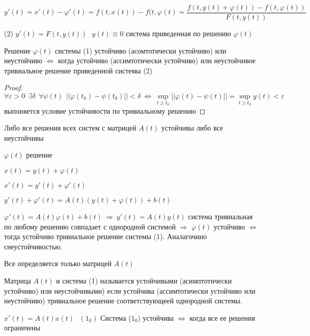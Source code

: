 $$
y'(t) = x'(t) - \varphi'(t) = f(t, x(t)) - f(t, \varphi(t) = \frac{f(t, y(t) +
\varphi(t)) - f(t, \varphi(t))}{F(t, y(t))}
$$

(2) $y'(t) = F(t, y(t)) ~~~ y(t) \equiv 0$ система приведенная по решению
$\varphi(t)$

\begin{block}[Утверждение]
  Решение $\varphi(t)$ системы (1) устойчиво (асомтотически устойчиво) или
  неустойчиво $\Leftrightarrow$ когда устойчиво (ассимтотически устойчиво) или
  неустойчивое тривиальное решение приведенной системы (2)
\end{block}

\begin{proof}
  $$
  \forall \varepsilon > 0 ~~ \exists \delta ~~ \forall \psi(t) ~~
  ||\varphi(t_0) - \psi(t_0)|| < \delta ~ \Leftrightarrow ~ \sup_{t \ge t_0}
  ||\varphi(t) - \psi(t)|| = \sup_{t \ge t_0} y(t) < \varepsilon
  $$
  выпоняется условие устойчивости по тривиальному решению
\end{proof}

\begin{block}[Утверждение]
  Либо все решения всех систем с матрицей $A(t)$ устойчивы либо все неустойчивы

  $\varphi(t)$ решение

  $x(t) = y(t) + \varphi(t)$

  $x'(t) = y'(t) + \varphi'(t)$

  $y'(t) + \varphi'(t) = A(t)(y(t) + \varphi(t)) + b(t)$

  $\varphi'(t) = A(t)\varphi(t) + b(t) ~ \Rightarrow ~ y'(t) = A(t)y(t)$
  система тривиальная по любому решению совпадает с однородной системой
  $\Rightarrow$ $\varphi(t)$ устойчиво $\Leftrightarrow$ тогда устойчиво
  тривиальное решение системы (1). Аналагочино снеустойчивостью.

  Все определяется только матрицей $A(t)$
\end{block}

\begin{define}
  Матрица $A(t)$ и система (1) называется устойчивыми (асимптотически устойчиво)
  или неустойчивыми) если устойчива (ассимтотически устойчиво или неустойчиво)
  тривиальное решение соответствующеей однородной системы.
\end{define}

\begin{block}[Утверждение 1]
  $x'(t) = A(t)x(t) ~~~ (1_0)$
  Система ($1_0$) устойчива $\Leftrightarrow$ когда все ее решения ограничены
\end{block}


